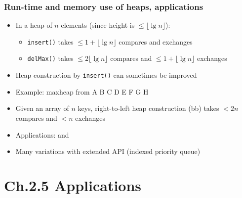 \documentclass[handout]{beamer}
\newcommand{\git}{https://github.com/marcbezem/INF102/blob/master}
\begin{document}
\begin{frame}
    \frametitle{Run-time and memory use of heaps, applications}

\begin{itemize}[<+->]
\item In a heap of $n$ elements (since height is $\leq \lfloor\lg n\rfloor$):
  \begin{itemize}[<+->]
  \item {\tt insert()} takes $\leq 1+\lfloor\lg n\rfloor$ compares
  and exchanges %
  \item {\tt delMax()} takes $\leq 2\lfloor\lg n\rfloor$ compares
   and $\leq 1{+}\lfloor\lg n\rfloor$ exchanges
  \end{itemize}
\item Heap construction by {\tt insert()} can sometimes be improved
\item Example: maxheap from A B C D E F G H
\item Given an array of $n$ keys, {right-to-left} heap construction (bb) 
           takes $<2n$ compares and $<n$ exchanges
\item Applications: \href{\git/programs/sorting/priorityQueues/NaiveHeapSort.java}%
{\color{red}{heapsort}} and
\href{\git/programs/sorting/priorityQueues/MultiwayMerge.java}%
{\color{red}{merging sorted streams}}
\item Many variations with extended API (indexed priority queue)
\end{itemize}
\end{frame}

\section{Ch.2.5 Applications}
\end{document}
